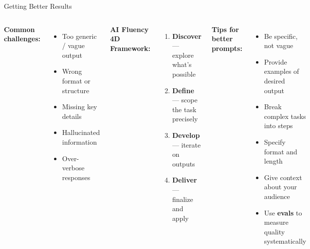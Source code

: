 \documentclass[aspectratio=169]{beamer}
\begin{document}
\begin{frame}{Getting Better Results}
\begin{columns}[T]
\textbf{\color{warnred}Common challenges:}
\begin{itemize}
  \item Too generic / vague output
  \item Wrong format or structure
  \item Missing key details
  \item Hallucinated information
  \item Over-verbose responses
\end{itemize}

\bigskip
\textbf{\color{popblue}AI Fluency 4D Framework:}
\begin{enumerate}
  \item \textbf{Discover} --- explore what's possible
  \item \textbf{Define} --- scope the task precisely
  \item \textbf{Develop} --- iterate on outputs
  \item \textbf{Deliver} --- finalize and apply
\end{enumerate}

\textbf{\color{paramgreen}Tips for better prompts:}
\begin{itemize}
  \item Be specific, not vague
  \item Provide examples of desired output
  \item Break complex tasks into steps
  \item Specify format and length
  \item Give context about your audience
  \item Use \textbf{evals} to measure quality systematically
\end{itemize}
\end{columns}
\end{frame}
\end{document}
